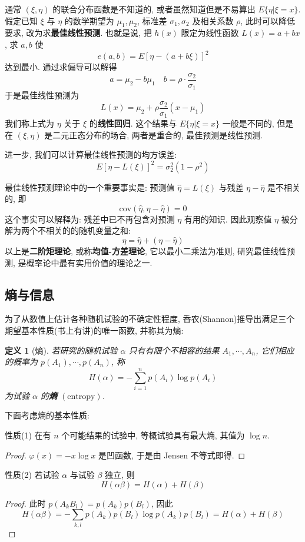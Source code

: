 \documentclass[12pt,a4paper]{article}
\newtheorem{definition}{定义}[subsection] %
\begin{document}
通常 $(\xi, \eta)$ 的联合分布函数是不知道的, 或者虽然知道但是不易算出 $E\{\eta | \xi = x\}$. 假定已知 $\xi$ 与 $\eta$ 的数学期望为 $\mu_1, \mu_2$, 
标准差 $\sigma_1, \sigma_2$ 及相关系数 $\rho$, 此时可以降低要求, 改为求\textbf{最佳线性预测}. 也就是说, 把 $h(x)$ 限定为线性函数 $L(x) = a + bx$, 求 $a, b$ 使 
\[e(a,b) = E[\eta - (a+b\xi)]^2\] 达到最小. 通过求偏导可以解得 \[ a=\mu_2 - b\mu_1 \quad b = \rho \cdot \frac{\sigma_2}{\sigma_1}\]
于是最佳线性预测为 \[ L(x) = \mu_2 + \rho \frac{\sigma_2}{\sigma_1}(x-\mu_1)\] 
我们称上式为 $\eta$ 关于 $\xi$ 的\textbf{线性回归}. 这个结果与 $E\{\eta | \xi = x\}$ 一般是不同的, 但是在 $(\xi, \eta)$ 是二元正态分布的场合, 两者是重合的, 最佳预测是线性预测. 

进一步, 我们可以计算最佳线性预测的均方误差:\[ E[\eta - L(\xi)]^2 = \sigma_2^2 (1-\rho^2)\]

最佳线性预测理论中的一个重要事实是: 预测值 $\hat{\eta} = L(\xi)$ 与残差 $\eta - \hat{\eta}$ 是不相关的, 即
\[\mathrm{cov}(\hat{\eta}, \eta - \hat{\eta}) = 0\] 这个事实可以解释为: 残差中已不再包含对预测 $\eta$ 有用的知识. 因此观察值 $\eta$ 被分解为两个不相关的的随机变量之和:
\[\eta = \hat{\eta} + (\eta - \hat{\eta})\]
以上是\textbf{二阶矩理论}, 或称\textbf{均值-方差理论}, 它以最小二乘法为准则, 研究最佳线性预测, 是概率论中最有实用价值的理论之一.
\subsection{熵与信息}
为了从数值上估计各种随机试验的不确定性程度, 香农(Shannon)推导出满足三个期望基本性质(书上有讲)的唯一函数, 并称其为熵:
\begin{definition}[熵]
    若研究的随机试验 $\alpha$ 只有有限个不相容的结果 $A_1, \cdots, A_n$, 它们相应的概率为 $p(A_1), \cdots, p(A_n)$, 称 
    \[H(\alpha) = - \sum\limits_{i=1}^n p(A_i) \log p(A_i)\] 为试验 $\alpha$ 的\textbf{熵} $(\mathrm{entropy})$.
\end{definition}

下面考虑熵的基本性质:

性质(1) 在有 $n$ 个可能结果的试验中, 等概试验具有最大熵, 其值为 $\log n$.
\begin{proof}
$\varphi(x) = -x\log x$ 是凹函数, 于是由 Jensen 不等式即得.
\end{proof}
性质(2) 若试验 $\alpha$ 与试验 $\beta$ 独立, 则 \[H(\alpha \beta) = H(\alpha) + H(\beta)\] 
\begin{proof}
    此时 $p(A_k B_l) = p(A_k)p(B_l)$, 因此
    \[H(\alpha \beta) = - \sum\limits_{k,l} p(A_k)p(B_l) \log p(A_k)p(B_l) = H(\alpha) + H(\beta)\]
\end{proof}
\end{document}
